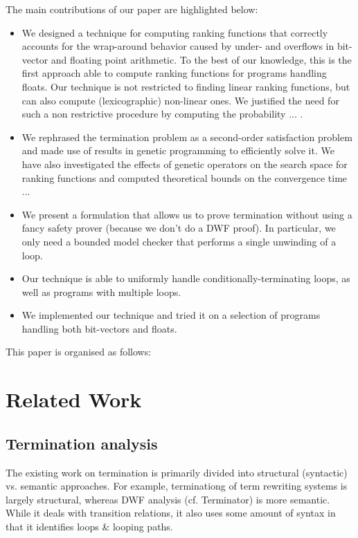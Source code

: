 \documentclass[preprint]{sigplanconf}
\theoremstyle{definition}
\begin{document}
The main contributions of our paper are highlighted below:
\begin{itemize}
\item We designed a technique for computing ranking functions that correctly accounts for the wrap-around behavior caused by under- and overflows in bit-vector and floating point arithmetic. To the best of our knowledge, this is the first approach able to compute ranking functions for programs handling floats. Our technique is not restricted to finding linear ranking functions, but can also compute (lexicographic) non-linear  ones. We justified the need for such a non restrictive procedure by computing the probability ... .
\item  We rephrased the termination problem as a second-order satisfaction problem and made 
use of results in genetic programming to efficiently solve it. We have also investigated the effects of genetic operators on the search space for ranking functions and computed theoretical 
bounds on the convergence time ...
\item We present a formulation that allows us to prove termination without using a fancy safety prover (because
we don't do a DWF proof).  In particular,
we only need a bounded model checker that performs a single unwinding of a loop.
\item Our technique is able to uniformly handle conditionally-terminating loops, as well as programs with
multiple loops.
\item We implemented our technique and tried it on a selection of programs handling both bit-vectors and floats.
\end{itemize}



This paper is organised as follows:

\section{Related Work}
\subsection{Termination analysis}
The existing work on termination is primarily divided into structural (syntactic) vs. semantic approaches.  
For example, terminationg of term rewriting systems is largely structural, whereas DWF analysis (cf. Terminator) is more semantic. While it deals
with transition relations, it also uses some amount of syntax in that it identifies loops \& looping paths.
\end{document}
